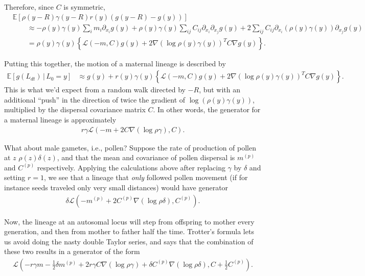 \documentclass{article}
\newcommand{\E}{\mathbb{E}}
\newcommand{\given}{\,\vert\,}
\newcommand{\grad}{\nabla}
\newcommand{\diffop}{\mathcal{L}}
\begin{document}
Therefore, since $C$ is symmetric,
\begin{align*}
    &
     \E\left[ \rho(y - R) \gamma(y - R) r(y) \left(g(y - R) - g(y)\right) \right]   \\
    &\qquad
     \approx
         - \rho(y) \gamma(y) \sum_i m_i \partial_{x_i} g(y) 
         + \rho(y) \gamma(y) \sum_{ij} C_{ij} \partial_{x_i} \partial_{x_j} g(y)
         + 2 \sum_{ij} C_{ij} \partial_{x_i} \left(\rho(y) \gamma(y)\right) \partial_{x_j} g(y)
     \\
     &\qquad
     = \rho(y) \gamma(y) \left\{ \diffop(-m,C) g(y) + 2 \grad(\log \rho(y) \gamma(y))^T C \grad g(y) \right\} .
\end{align*}

Putting this together,
the motion of a maternal lineage is described by
\begin{align*}
    \E[g(L_{dt}) \given L_0 = y]
    &\approx
    g(y) + r(y) \gamma(y)
    \left\{ 
        \diffop(-m,C) g(y)
        + 2 \grad(\log \rho(y) \gamma(y))^T C \grad g(y)
    \right\} .
\end{align*}
This is what we'd expect from a random walk directed by $-R$,
but with an additional ``push''
in the direction of twice the gradient of $\log(\rho(y) \gamma(y))$,
multiplied by the dispersal covariance matrix $C$.
In other words, the generator for a maternal lineage is approximately
\begin{align} \label{eqn:mat_generator}
    r \gamma \diffop\left(- m + 2 C \grad(\log \rho \gamma), C \right) .
\end{align}

What about male gametes, i.e., pollen?
Suppose the rate of production of pollen at $z$ $\rho(z) \delta(z)$,
and that the mean and covariance of pollen dispersal is $m^{(p)}$ and $C^{(p)}$ respectively.
Applying the calculations above after replacing $\gamma$ by $\delta$ and setting $r = 1$,
we see that a lineage that \emph{only} followed pollen movement
(if for instance seeds traveled only very small distances)
would have generator
\begin{align*}
    \delta \diffop\left(-m^{(p)} + 2  C^{(p)} \grad(\log \rho \delta), C^{(p)} \right) .
\end{align*}

Now, the lineage at an autosomal locus will step from offspring to mother every generation,
and then from mother to father half the time.
Trotter's formula lets us avoid doing the nasty double Taylor series,
and says that the combination of these two results in a generator of the form
\begin{align} \label{eqn:final_generator}
    \diffop\left(
        - r \gamma m - \frac{1}{2} \delta m^{(p)} 
        + 2 r \gamma C \grad(\log \rho \gamma)
        + \delta C^{(p)} \grad(\log \rho \delta)
        ,
        C + \frac{1}{2} C^{(p)}
    \right) .
\end{align}
\end{document}
